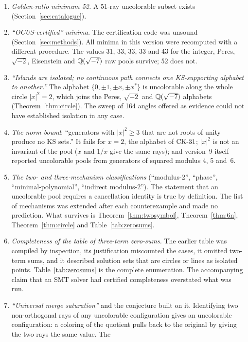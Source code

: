\begin{enumerate}[label=C\arabic*.,leftmargin=2.6em]
\item \emph{Golden-ratio minimum 52.}  A 51-ray uncolorable subset exists
(Section~\ref{sec:catalogue}).
\item \emph{``OCUS-certified'' minima.}  The certification code was unsound
(Section~\ref{sec:methods}).  All minima in this version were recomputed with a different
procedure.  The values 31, 33, 33, 33 and 43 for the integer, Peres, $\sqrt{-2}$, Eisenstein and
$\mathbb{Q}(\sqrt{-7})$ raw pools survive; 52 does not.
\item \emph{``Islands are isolated; no continuous path connects one KS-supporting alphabet to
another.''}  The alphabet $\{0,\pm1,\pm x,\pm x^{*}\}$ is uncolorable along the whole circle
$|x|^2=2$, which joins the Peres, $\sqrt{-2}$ and $\mathbb{Q}(\sqrt{-7})$ alphabets
(Theorem~\ref{thm:circle}).  The sweep of 164 angles offered as evidence could not have
established isolation in any case.
\item \emph{The norm bound}: ``generators with $|x|^2\ge3$ that are not roots of unity produce no
KS sets.''  It fails for $x=2$, the alphabet of $\mathrm{CK}\text{-}31$; $|x|^2$ is not an invariant of the pool
($x$ and $1/x$ give the same rays); and version~9 itself reported uncolorable pools from
generators of squared modulus 4, 5 and~6.
\item \emph{The two- and three-mechanism classifications} (``modulus-2'', ``phase'',
``minimal-polynomial'', ``indirect modulus-2'').  The statement that an uncolorable pool requires
a cancellation identity is true by definition.  The list of mechanisms was extended after each
counterexample and made no prediction.  What survives is Theorem~\ref{thm:twosymbol},
Theorem~\ref{thm:6n}, Theorem~\ref{thm:circle} and Table~\ref{tab:zerosums}.
\item \emph{Completeness of the table of three-term zero-sums.}  The earlier table was compiled
by inspection, its justification miscounted the cases, it omitted two-term sums, and it described
solution sets that are circles or lines as isolated points.  Table~\ref{tab:zerosums} is the
complete enumeration.  The accompanying claim that an SMT solver had certified completeness
overstated what was run.
\item \emph{``Universal merge saturation''} and the conjecture built on it.  Identifying two
non-orthogonal rays of any uncolorable configuration gives an uncolorable configuration: a
coloring of the quotient pulls back to the original by giving the two rays the same value.  The

\end{enumerate}
